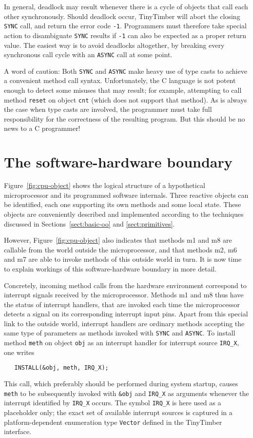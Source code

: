 \documentclass[12pt]{article}
\begin{document}
In general, deadlock may result whenever there is a cycle of objects that call each other synchronously.  Should deadlock occur, TinyTimber will abort the closing {\tt SYNC} call, and return the error code {\tt -1}.  Programmers must therefore take special action to disambiguate {\tt SYNC} results if {\tt -1} can also be expected as a proper return value.  The easiest way is to avoid deadlocks altogether, by breaking every synchronous call cycle with an {\tt ASYNC} call at some point.

A word of caution: Both {\tt SYNC} and {\tt ASYNC} make heavy use of type casts to achieve a convenient method call syntax.  Unfortunately, the C language is not potent enough to detect some misuses that may result; for example, attempting to call method {\tt reset} on object {\tt cnt} (which does not support that method).  As is always the case when type casts are involved, the programmer must take full responsibility for the correctness of the resulting program.  But this should be no news to a C programmer!


\section{The software-hardware boundary}
\label{sect:top-level}

Figure~\ref{fig:cpu-object} shows the logical structure of a hypothetical microprocessor and its programmed software internals.  Three reactive objects can be identified, each one supporting its own methods and some local state.  These objects are conveniently described and implemented according to the techniques discussed in Sections~\ref{sect:basic-oo} and \ref{sect:primitives}.  

However, Figure~\ref{fig:cpu-object} also indicates that methods m1 and m8 are callable from the world outside the microprocessor, and that methods m2, m6 and m7 are able to invoke methods of this outside world in turn. It is now time to explain workings of this software-hardware boundary in more detail.

Concretely, incoming method calls from the hardware environment correspond to interrupt signals received by the microprocessor. Methods m1 and m8 thus have the status of interrupt handlers, that are invoked each time the microprocessor detects a signal on its corresponding interrupt input pins. Apart from this special link to the outside world, interrupt handlers are ordinary methods accepting the same type of parameters as methods invoked with {\tt SYNC} and {\tt ASYNC}. To install method {\tt meth} on object {\tt obj} as an interrupt handler for interrupt source {\tt IRQ\_X}, one writes
\begin{verbatim}
   INSTALL(&obj, meth, IRQ_X);
\end{verbatim}
This call, which preferably should be performed during system startup, causes {\tt meth} to be subsequently invoked with {\tt \&obj} and {\tt IRQ\_X} as arguments whenever the interrupt identified by {\tt IRQ\_X} occurs. The symbol {\tt IRQ\_X} is here used as a placeholder only; the exact set of available interrupt sources is captured in a platform-dependent enumeration type {\tt Vector} defined in the TinyTimber interface.
\end{document}
